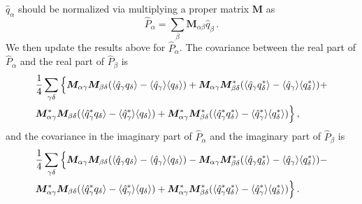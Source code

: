 \documentclass[12pt,a4paper]{article}
\begin{document}
$\hat{q}_\alpha$ should be normalized via multiplying a proper matrix $\bm{M}$ as
\begin{equation}
\label{eq:palpha}
    \hat{P}_\alpha = \sum_{\beta} \bm{M}_{\alpha\beta} \hat{q}_\beta \,.
\end{equation}
We then update the results above for $\hat{P}_\alpha$. The covariance between the real part of $\hat{P}_\alpha$ and the real part of $\hat{P}_\beta$ is
\begin{align}
    &\frac{1}{4} \sum_{\gamma\delta} \Big\{ \bm{M}_{\alpha\gamma} \bm{M}_{\beta\delta} (\langle \hat{q}_\gamma q_\delta \rangle - \langle \hat{q}_\gamma \rangle\langle q_\delta\rangle) + \bm{M}_{\alpha\gamma} \bm{M}_{\beta\delta}^* (\langle \hat{q}_\gamma q_\delta^*\rangle - \langle \hat{q}_\gamma \rangle\langle q_\delta^*\rangle) + \notag\\&
        \bm{M}_{\alpha\gamma}^* \bm{M}_{\beta\delta} (\langle \hat{q}_\gamma^* q_\delta \rangle - \langle \hat{q}_\gamma^* \rangle\langle q_\delta \rangle) +
        \bm{M}_{\alpha\gamma}^* \bm{M}_{\beta\delta}^* (\langle \hat{q}_\gamma^* q_\delta^*\rangle - \langle \hat{q}_\gamma^*\rangle\langle q_\delta^*\rangle) \Big\}\,,
\end{align}
and the covariance in the imaginary part of $\hat{P}_\alpha$ and the imaginary part of $\hat{P}_\beta$ is
\begin{align}
    &\frac{1}{4} \sum_{\gamma\delta} \Big\{ \bm{M}_{\alpha\gamma} \bm{M}_{\beta\delta} (\langle \hat{q}_\gamma q_\delta \rangle - \langle \hat{q}_\gamma \rangle\langle q_\delta\rangle) - \bm{M}_{\alpha\gamma} \bm{M}_{\beta\delta}^* (\langle \hat{q}_\gamma q_\delta^*\rangle - \langle \hat{q}_\gamma \rangle\langle q_\delta^*\rangle) - \notag\\&
        \bm{M}_{\alpha\gamma}^* \bm{M}_{\beta\delta} (\langle \hat{q}_\gamma^* q_\delta \rangle - \langle \hat{q}_\gamma^* \rangle\langle q_\delta \rangle) +
        \bm{M}_{\alpha\gamma}^* \bm{M}_{\beta\delta}^* (\langle \hat{q}_\gamma^* q_\delta^*\rangle - \langle \hat{q}_\gamma^*\rangle\langle q_\delta^*\rangle) \Big\}\,.
\end{align}
\end{document}
